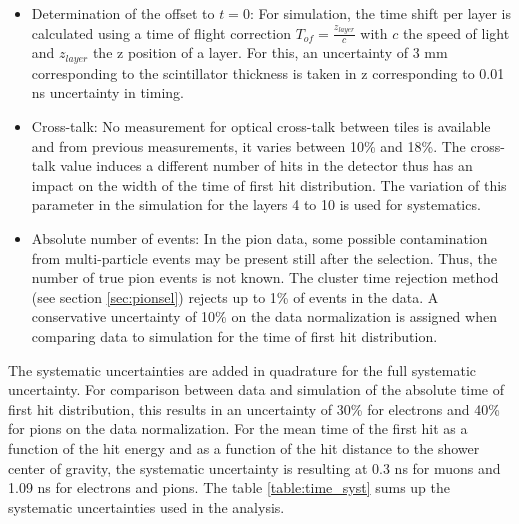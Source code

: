 \begin{itemize}
	\item Determination of the offset to $t=0$: For simulation, the time shift per layer is calculated using a time of flight correction $T_{of} = \frac{z_{layer}}{c}$ with $c$ the speed of light and $z_{layer}$ the z position of a layer. For this, an uncertainty of 3 mm corresponding to the scintillator thickness is taken in z corresponding to 0.01 ns uncertainty in timing.
	\item Cross-talk: No measurement for optical cross-talk between tiles is available and from previous measurements, it varies between 10\% and 18\%. The cross-talk value induces a different number of hits in the detector thus has an impact on the width of the time of first hit distribution. The variation of this parameter in the simulation for the layers 4 to 10 is used for systematics.
	\item Absolute number of events: In the pion data, some possible contamination from multi-particle events may be present still after the selection. Thus, the number of true pion events is not known. The cluster time rejection method (see section \ref{sec:pionsel}) rejects up to 1\% of events in the data. A conservative uncertainty of 10\% on the data normalization is assigned when comparing data to simulation for the time of first hit distribution.
\end{itemize}

The systematic uncertainties are added in quadrature for the full systematic uncertainty. For comparison between data and simulation of the absolute time of first hit distribution, this results in an uncertainty of 30\% for electrons and 40\% for pions on the data normalization. For the mean time of the first hit as a function of the hit energy and as a function of the hit distance to the shower center of gravity, the systematic uncertainty is resulting at 0.3 ns for muons and 1.09 ns for electrons and pions. The table \ref{table:time_syst} sums up the systematic uncertainties used in the analysis.

